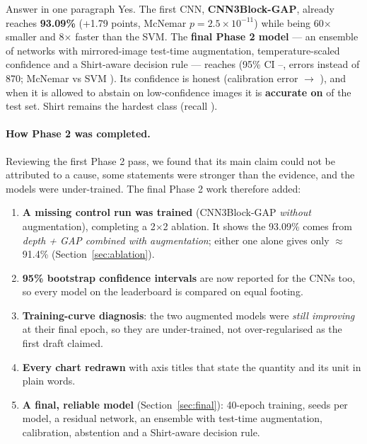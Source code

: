 \documentclass[11pt,a4paper]{article}
\begin{document}
\begin{keybox}{Answer in one paragraph}
Yes. The first CNN, \textbf{CNN3Block-GAP}, already reaches \textbf{93.09\%} (+1.79 points, McNemar
$p = 2.5\times10^{-11}$) while being 60$\times$ smaller and 8$\times$ faster than the SVM. The \textbf{final Phase 2
model} --- an ensemble of \FinalMembers{} networks with mirrored-image test-time augmentation, temperature-scaled
confidence and a Shirt-aware decision rule --- reaches \textbf{\FinalAcc} (95\% CI \FinalCIlo--\FinalCIhi,
\FinalErr{} errors instead of 870; McNemar vs SVM \PvsSVM). Its confidence is honest (calibration error
\EceBefore{} $\rightarrow$ \EceAfter), and when it is allowed to abstain on low-confidence images it is
\textbf{\AbsAcc{} accurate on \AbsCov{}} of the test set. Shirt remains the hardest class (recall \FinalShirt).
\end{keybox}

\paragraph{How Phase 2 was completed.} Reviewing the first Phase 2 pass, we found that its main claim could
not be attributed to a cause, some statements were stronger than the evidence, and the models were under-trained.
The final Phase 2 work therefore added:
\begin{enumerate}
  \item \textbf{A missing control run was trained} (CNN3Block-GAP \emph{without} augmentation), completing a
        2$\times$2 ablation. It shows the 93.09\% comes from \emph{depth + GAP combined with augmentation};
        either one alone gives only $\approx$91.4\% (Section~\ref{sec:ablation}).
  \item \textbf{95\% bootstrap confidence intervals} are now reported for the CNNs too, so every model on the
        leaderboard is compared on equal footing.
  \item \textbf{Training-curve diagnosis}: the two augmented models were \emph{still improving} at their final
        epoch, so they are under-trained, not over-regularised as the first draft claimed.
  \item \textbf{Every chart redrawn} with axis titles that state the quantity and its unit in plain words.
  \item \textbf{A final, reliable model} (Section~\ref{sec:final}): 40-epoch training, \NSeeds{} seeds per model, a residual
        network, an ensemble with test-time augmentation, calibration, abstention and a Shirt-aware decision rule.
\end{enumerate}
\end{document}
